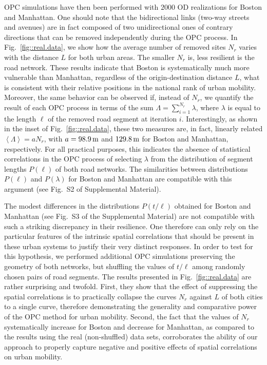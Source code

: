 \documentclass[aps,prl,twocolumn,showpacs,
superscriptaddress,floatfix, 10pt]{revtex4-1}
\begin{document}
OPC simulations have then been performed with $2000$ OD realizations for Boston
and Manhattan. One should note that the bidirectional links (two-way streets and
avenues) are in fact composed of two unidirectional ones of contrary directions
that can be removed independently during the OPC process. 
In Fig.~\ref{fig::real.data}, we show how the average number of removed sites
$N_r$ varies with the distance $L$ for both urban areas. The smaller $N_r$ is,
less resilient is the road network. These results indicate that Boston is
systematically much more vulnerable than Manhattan, regardless of the
origin-destination distance $L$, what is consistent with their relative
positions in the national rank of urban mobility. Moreover, the same behavior
can be observed if, instead of $N_r$, we quantify the result of each OPC process
in terms of the sum $\Lambda=\sum_{i=1}^{N_r}\lambda$, where $\lambda$ is equal
to the length $\ell$ of the removed road segment at iteration $i$.
Interestingly, as shown in the inset of Fig.~\ref{fig::real.data}, these two
measures are, in fact, linearly related $\left<\Lambda\right>=a N_r$, with $a =
98.9\,\rm{m}$ and $129.8\,\rm{m}$ for Boston and Manhattan, respectively. For
all practical purposes, this indicates the absence of statistical correlations
in the OPC process of selecting $\lambda$ from the distribution of segment
lengths $P(\ell)$ of both road networks. The similarities between distributions
$P(\ell)$ and $P(\lambda)$ for Boston and Manhattan are compatible with this
argument (see Fig.~S2 of Supplemental Material).

The modest differences in the distributions $P(t/\ell)$ obtained for Boston and
Manhattan (see Fig.~S3 of the Supplemental Material) are not compatible
with such a striking discrepancy in their resilience. One therefore can only
rely on the particular features of the intrinsic spatial correlations that
should be present in these urban systems to justify their very distinct
responses. In order to test for this hypothesis, we performed additional OPC
simulations preserving the geometry of both networks, but shuffling the values
of $t/\ell$ among randomly chosen pairs of road segments. The results presented
in Fig.~\ref{fig::real.data} are rather surprising and twofold. First, they show
that the effect of suppressing the spatial correlations is to practically
collapse the curves $N_r$ against $L$ of both cities to a single curve,
therefore demonstrating the generality and comparative power of the OPC method
for urban mobility. Second, the fact that the values of $N_r$ systematically
increase for Boston and decrease for Manhattan, as compared to the results using
the real (non-shuffled) data sets, corroborates the ability of our approach to
properly capture negative and positive effects of spatial correlations on urban
mobility.
	
\end{document}
